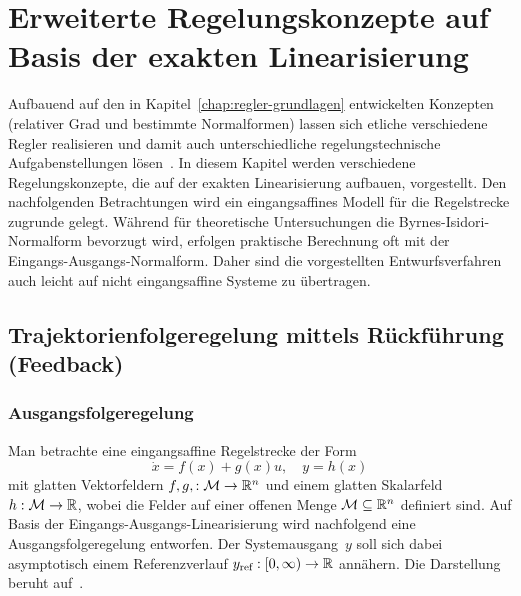 
\chapter{Erweiterte Regelungskonzepte auf Basis der exakten Linearisierung\label{chap:regler-varianten}}

Aufbauend auf den in Kapitel~\ref{chap:regler-grundlagen} entwickelten
Konzepten (relativer Grad und bestimmte Normalformen) lassen sich
etliche verschiedene Regler realisieren und damit auch unterschiedliche
regelungstechnische Aufgabenstellungen lösen~\cite{henson1997chap4}.
In diesem Kapitel werden verschiedene Regelungskonzepte, die auf der
exakten Linearisierung aufbauen, vorgestellt. Den nachfolgenden Betrachtungen
wird ein eingangsaffines Modell für die Regelstrecke zugrunde gelegt.
Während für theoretische Untersuchungen die Byrnes-Isidori-Normalform
bevorzugt wird, erfolgen praktische Berechnung oft mit der Eingangs-Ausgangs-Normalform.
Daher sind die vorgestellten Entwurfsverfahren auch leicht auf nicht
eingangsaffine Systeme zu übertragen.

\section{Trajektorienfolgeregelung mittels Rückführung (Feed\-back)\label{sec:Trajektorienfolgeregelung-Feedback}}

\subsection{Ausgangsfolgeregelung\label{subsec:Ausgangsfolgeregelung}}

Man betrachte eine eingangsaffine Regelstrecke der Form
\begin{equation}
\dot{x}=f(x)+g(x)u,\quad y=h(x)\label{eq:var-basissystem}
\end{equation}
mit glatten Vektorfeldern $f,g,:\mathcal{M}\to{\mathbb{R}}^{n}$ und einem glatten
Skalarfeld $h:\mathcal{M}\to{\mathbb{R}}$, wobei die Felder auf einer offenen
Menge $\mathcal{M}\subseteq{\mathbb{R}}^{n}$ definiert sind. Auf Basis der
Eingangs-Ausgangs-Linearisierung wird nachfolgend eine Ausgangsfolgeregelung
entworfen. Der Systemausgang~$y$ soll sich dabei asymp\-totisch
einem Referenzverlauf $y_{\text{ref}}:[0,\infty)\to{\mathbb{R}}$ annähern.
Die Darstellung beruht auf~\cite[Abschn.~{4.5}]{isidori3}.


